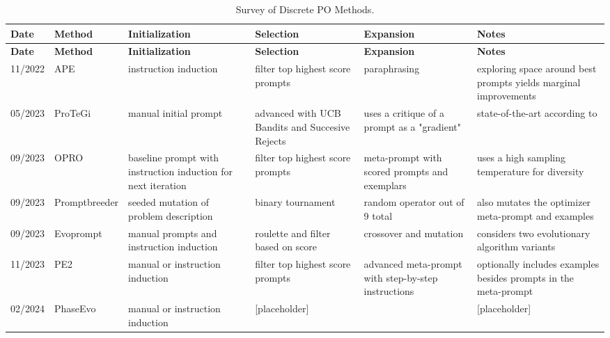 \begin{landscape}
\begin{longtable}{@{}l l p{3.5cm} p{3.5cm} p{3.5cm} p{3.5cm}@{}}
\caption{Survey of Discrete PO Methods.} \label{tab:optsurvey} \\

\toprule
\textbf{Date} & \textbf{Method} & \textbf{Initialization} & \textbf{Selection} & \textbf{Expansion} & \textbf{Notes} \\
\midrule
\endfirsthead

\toprule
\textbf{Date} & \textbf{Method} & \textbf{Initialization} & \textbf{Selection} & \textbf{Expansion} & \textbf{Notes} \\
\midrule
\endhead
11/2022 & APE\cite{zhou2023largelanguagemodelshumanlevel} & instruction induction & filter top highest score prompts & paraphrasing & exploring space around best prompts yields marginal improvements \\
05/2023 & ProTeGi\cite{pryzant2023automaticpromptoptimizationgradient} & manual initial prompt & advanced with UCB Bandits and Succesive Rejects & uses a critique of a prompt as a "gradient" & state-of-the-art according to\cite{wan2024teachbettersmarterinstructions} \\
09/2023 & OPRO\cite{yang2024largelanguagemodelsoptimizers} & baseline prompt with instruction induction for next iteration & filter top highest score prompts & meta-prompt with scored prompts and exemplars & uses a high sampling temperature for diversity \\
09/2023 & Promptbreeder\cite{fernando2023promptbreederselfreferentialselfimprovementprompt} & seeded mutation of problem description & binary tournament & random operator out of 9 total & also mutates the optimizer meta-prompt and examples \\
09/2023 & Evoprompt\cite{guo2024connectinglargelanguagemodels} & manual prompts and instruction induction & roulette and filter based on score & crossover and mutation & considers two evolutionary algorithm variants \\
11/2023 & PE2\cite{ye2024promptengineeringpromptengineer} & manual or instruction induction & filter top highest score prompts & advanced meta-prompt with step-by-step instructions & optionally includes examples besides prompts in the meta-prompt \\
02/2024 & PhaseEvo\cite{cui2024phaseevounifiedincontextprompt} & manual or instruction induction & [placeholder] &  & [placeholder] \\

\end{longtable}
\end{landscape}
